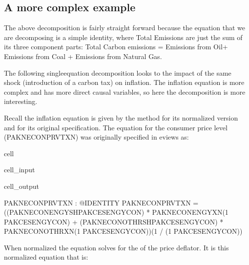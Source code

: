 \documentclass[letterpaper,10pt,english]{jupyterBook}
\begin{document}
\subsection{A more complex example}
\label{\detokenize{content/06_ModelAnalytics/AttributionSomeFeatures:a-more-complex-example}}
\sphinxAtStartPar
The above decomposition is fairly straight forward because the equation that we are decomposing is a simple identity, where Total Emissions are just the sum of its three component parts: Total Carbon emissions = Emissions from Oil+  Emissions from Coal + Emissions from Natural Gas.

\sphinxAtStartPar
The following single\sphinxhyphen{}equation decomposition looks to the impact of the same shock (introduction of a carbon tax) on inflation.  The inflation equation is more complex and has more direct causal variables, so here the decomposition is more interesting.

\sphinxAtStartPar
Recall the inflation equation is given by the  method for its normalized version and  for its original specification.  The equation for the consumer price level (PAKNECONPRVTXN) was originally specified in eviews as:

\begin{sphinxuseclass}{cell}\begin{sphinxVerbatimInput}

\begin{sphinxuseclass}{cell_input}
\begin{sphinxVerbatim}[commandchars=\\\{\}]
\PYG{p}{[}\PYG{p}{]}
\end{sphinxVerbatim}

\end{sphinxuseclass}\end{sphinxVerbatimInput}
\begin{sphinxVerbatimOutput}

\begin{sphinxuseclass}{cell_output}
\begin{sphinxVerbatim}[commandchars=\\\{\}]
PAKNECONPRVTXN : @IDENTITY PAKNECONPRVTXN  = ((PAKNECONENGYSH\PYGZca{}PAKCESENGYCON)  * PAKNECONENGYXN\PYGZca{}(1  \PYGZhy{} PAKCESENGYCON)  + (PAKNECONOTHRSH\PYGZca{}PAKCESENGYCON)  * PAKNECONOTHRXN\PYGZca{}(1  \PYGZhy{} PAKCESENGYCON))\PYGZca{}(1  / (1  \PYGZhy{} PAKCESENGYCON))
\end{sphinxVerbatim}

\end{sphinxuseclass}\end{sphinxVerbatimOutput}

\end{sphinxuseclass}
\sphinxAtStartPar
When normalized the equation solves for the  of the price deflator.  It is this normalized equation that is:
\end{document}
